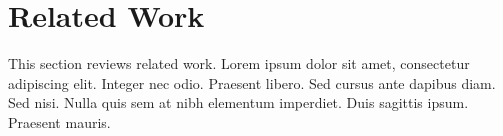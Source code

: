 \section{Related Work}
This section reviews related work. Lorem ipsum dolor sit amet, consectetur adipiscing elit. Integer nec odio. Praesent libero. 
Sed cursus ante dapibus diam. Sed nisi. Nulla quis sem at nibh elementum imperdiet. Duis sagittis ipsum. Praesent mauris.